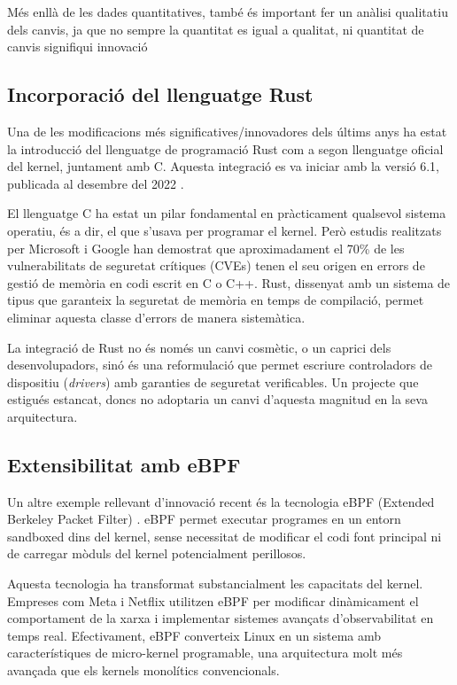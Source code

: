 \documentclass{article}
\begin{document}
Més enllà de les dades quantitatives, també és important fer un anàlisi qualitatiu dels canvis, ja que no sempre la quantitat es igual a qualitat, ni quantitat de canvis signifiqui innovació

\subsection{Incorporació del llenguatge Rust}

Una de les modificacions més significatives/innovadores dels últims anys ha estat la introducció del llenguatge de programació Rust com a segon llenguatge oficial del kernel, juntament amb C. Aquesta integració es va iniciar amb la versió 6.1, publicada al desembre del 2022 \cite{kernel_rust_docs}.

El llenguatge C ha estat un pilar fondamental en pràcticament qualsevol sistema operatiu, és a dir, el que s'usava per programar el kernel. Però estudis realitzats per Microsoft i Google \cite{microsoft_rust_study} \cite{google_rust_study} han demostrat que aproximadament el 70\% de les vulnerabilitats de seguretat crítiques (CVEs) tenen el seu origen en errors de gestió de memòria en codi escrit en C o C++. Rust, dissenyat amb un sistema de tipus que garanteix la seguretat de memòria en temps de compilació, permet eliminar aquesta classe d'errors de manera sistemàtica.

La integració de Rust no és només un canvi cosmètic, o un caprici dels desenvolupadors, sinó és una reformulació que permet escriure controladors de dispositiu (\textit{drivers}) amb garanties de seguretat verificables. Un projecte que estigués estancat, doncs no adoptaria un canvi d'aquesta magnitud en la seva arquitectura.

\subsection{Extensibilitat amb eBPF}

Un altre exemple rellevant d'innovació recent és la tecnologia eBPF (Extended Berkeley Packet Filter) \cite{ebpf_docs} \cite{kernel_bpf_docs} \cite{lwn_ebpf_kernel}. eBPF permet executar programes en un entorn sandboxed dins del kernel, sense necessitat de modificar el codi font principal ni de carregar mòduls del kernel potencialment perillosos.

Aquesta tecnologia ha transformat substancialment les capacitats del kernel. Empreses com Meta i Netflix utilitzen eBPF per modificar dinàmicament el comportament de la xarxa i implementar sistemes avançats d'observabilitat en temps real. Efectivament, eBPF converteix Linux en un sistema amb característiques de micro-kernel programable, una arquitectura molt més avançada que els kernels monolítics convencionals.
\end{document}
